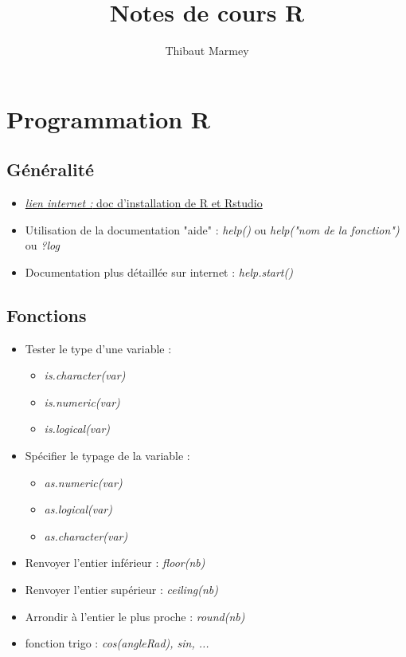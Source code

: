 \documentclass[12pt,a4paper]{article}
\author{Thibaut Marmey}
\title{Notes de cours R}
\begin{document}
	\maketitle

\begin{normalsize}
\tableofcontents
\end{normalsize}

\section{Programmation R}
\subsection{Généralité}
\begin{itemize}
\item \href{https://linuxconfig.org/rstudio-on-ubuntu-18-04-bionic-beaver-linux}{\textit{lien internet : }doc d'installation de R et Rstudio}
\item Utilisation de la documentation "aide" : \textit{help()} ou \textit{help("nom de la fonction")} ou  \textit{?log}
\item Documentation plus détaillée sur internet : \textit{help.start()}
\end{itemize}

\subsection{Fonctions}
\begin{itemize}
\item Tester le type d'une variable :
\begin{itemize}
\item \textit{is.character(var)}
\item \textit{is.numeric(var)}
\item \textit{is.logical(var)}
\end{itemize}
\item Spécifier le typage de la variable :
\begin{itemize}
\item \textit{as.numeric(var)}
\item \textit{as.logical(var)}
\item \textit{as.character(var)}
\end{itemize}
\item Renvoyer l'entier inférieur : \textit{floor(nb)}
\item Renvoyer l'entier supérieur : \textit{ceiling(nb)}
\item Arrondir à l'entier le plus proche : \textit{round(nb)}
\item fonction trigo : \textit{cos(angleRad), sin, ...}
\end{itemize}
\end{document}
